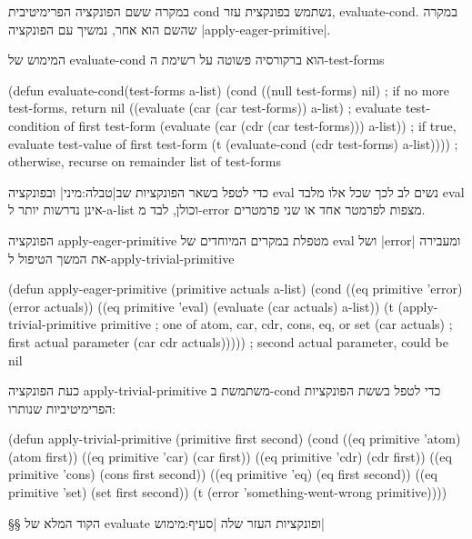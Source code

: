 במקרה ששם הפונקציה הפרימיטיבית cond נשתמש בפונקצית עזר, evaluate-cond. במקרה
שהשם הוא אחר, נמשיך עם הפונקציה \E|apply-eager-primitive|.

המימוש של evaluate-cond הוא ברקורסיה פשוטה על רשימת ה-test-forms
\begin{KERNEL}
(defun evaluate-cond(test-forms a-list)
  (cond ((null test-forms) nil) ; if no more test-forms, return nil
        ((evaluate (car (car test-forms)) a-list) ; evaluate test-condition of first test-form
        (evaluate (car (cdr (car test-forms))) a-list)) ; if true, evaluate test-value of first test-form
        (t (evaluate-cond (cdr test-forms) a-list)))) ; otherwise, recurse on remainder list of test-forms
\end{KERNEL}

כדי לטפל בשאר הפונקציות שב|טבלה:מיני| ובפונקציה eval נשים לב לכך שכל אלו
מלבד eval אינן נדרשות יותר ל-a-list וכולן, לבד מ-error מצפות לפרמטר אחד או שני פרמטרים.

הפונקציה apply-eager-primitive מטפלת במקרים המיוחדים של eval ושל \E|error|
ומעבירה את המשך הטיפול ל-apply-trivial-primitive
\begin{KERNEL}
(defun apply-eager-primitive (primitive actuals a-list)
  (cond ((eq primitive 'error) (error actuals))
        ((eq primitive 'eval) (evaluate (car actuals) a-list))
        (t (apply-trivial-primitive
              primitive ; one of atom, car, cdr, cons, eq, or set
              (car actuals) ; first actual parameter
              (car cdr actuals))))) ; second actual parameter, could be nil
\end{KERNEL}

כעת הפונקציה apply-trivial-primitive משתמשת ב-cond כדי לטפל בששת הפונקציות הפרימיטיביות שנותרו:
\begin{KERNEL}
(defun apply-trivial-primitive (primitive first second)
  (cond ((eq primitive 'atom) (atom first))
        ((eq primitive 'car) (car first))
        ((eq primitive 'cdr) (cdr first))
        ((eq primitive 'cons) (cons first second))
        ((eq primitive 'eq) (eq first second))
        ((eq primitive 'set) (set first second))
        (t (error 'something-went-wrong primitive))))
\end{KERNEL}

\eject
§§ הקוד המלא של evaluate ופונקציות העזר שלה
|סעיף:מימוש|

\immediate\closeout {}

\begin{LTR}
  
\end{LTR}

